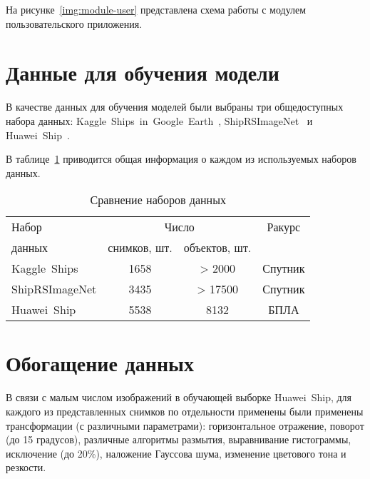 На рисунке~\ref{img:module-user} представлена схема работы с модулем пользовательского приложения.



\section{Данные для обучения модели}

В качестве данных для обучения моделей были выбраны три общедоступных набора данных: Kaggle~Ships~in~Google~Earth~\cite{kaggle-ships-in-google-earth-dfqwt_dataset}, ShipRSImageNet~\cite{shiprs-imagenet} и Huawei~Ship~\cite{huawei_ship_dataset}.

В таблице~\ref{tbl:cmp-by-ap} приводится общая информация о каждом из используемых наборов данных.

\begin{table}[!h]
    \small
    \begin{center}
        \caption{Сравнение наборов данных}
        \label{tbl:cmp-by-ap}
        \begin{tabular}{|l|cc|c|}
            \hline
            Набор  & \multicolumn{2}{c|}{Число} & Ракурс \\\cline{2-3}
            данных & снимков, шт. & объектов, шт. & \\\hline

            Kaggle~Ships & 1658 & > 2000  & Спутник \\    
            ShipRSImageNet & 3435 & > 17500 & Спутник \\
            Huawei~Ship & 5538 & 8132 & БПЛА \\
            \hline
        \end{tabular}
    \end{center}
\end{table}

\section{Обогащение данных}

В связи с малым числом изображений в обучающей выборке Huawei~Ship, для каждого из представленных снимков по отдельности применены были применены трансформации (с различными параметрами): горизонтальное отражение, поворот (до 15 градусов), различные алгоритмы размытия, выравнивание гистограммы, исключение (до 20\%), наложение Гауссова шума, изменение цветового тона и резкости.

